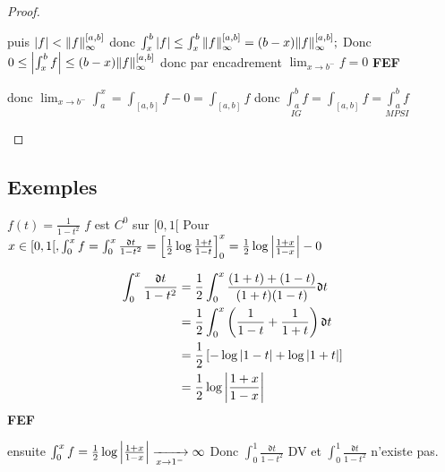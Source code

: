\documentclass[11pt,hidelinks]{book}
\theoremstyle{mytheoremstyle}
\theoremstyle{mytheoremstyle}
\theoremstyle{mytheoremstyle}
\theoremstyle{mytheoremstyle}
\theoremstyle{mytheoremstyle}
\theoremstyle{mytheoremstyle}
\theoremstyle{mytheoremstyle}
\theoremstyle{mytheoremstyle}
\theoremstyle{myproblemstyle}
\def\mfk#1{\mathfrak{#1}}
\def\fef{\textbf{FEF}}
\begin{document}
\begin{adjustwidth}{-2em}{-1em}
\begin{theorem}
\begin{proof}
\begin{itemize}[label=$\circ$]
\begin{ef}
                    puis $\abs{f} < \norm{f}_{\infty}^{[a,b]}$ donc $\int_{x}^{b} \abs{f} \leq \int_{x}^{b} \norm{f}_{\infty}^{[a,b]} = (b-x)\norm{f}^{[a,b]}_{\infty};$
                     Donc $0 \leq \abs{\int_{x}^{b} f} \leq (b-x)\norm{f}_{\infty}^{[a,b]}$ 
                    donc par encadrement $\lim_{x \to b^-} f = 0$ \fef
                \end{ef}
                donc $\lim_{x \to b^-} \int_{a}^{x} = \int_{[a,b]} f - 0 = \int_{[a,b]} f$
                donc $\underset{IG}{\int_{a}^{b} f} = \int_{[a,b]} f = \underset{MPSI}{\int_{a}^{b} f}$
            \end{itemize}
            \end{proof}
        \end{theorem}
        \subsection{Exemples}
        \begin{ex}
            $f(t) = \frac{1}{1-t^2}$ $f$ est $C^0$ sur $[0,1[$ 
            \newline 
            Pour $x \in [0,1[, \int_{0}^{x} f = \int_{0}^{x} \frac{\mfk{d}t}{1-t^2} = 
            \left[ \frac{1}{2} \log{\frac{1+t}{1-t}} \right]^x_0 = \frac{1}{2} \log{\abs{\frac{1+x}{1-x}}} - 0$
            \begin{ef}
                \begin{align*}
                    \int_{0}^{x} \frac{\mfk{d}t}{1-t^2} &= \frac{1}{2} \int_{0}^{x} \frac{(1+t) + (1-t)}{(1+t)(1-t)} \mfk{d}t \\ 
                                                        &= \frac{1}{2} \int_{0}^{x} \left( \frac{1}{1-t} + \frac{1}{1+t} \right) \mfk{d}t \\ 
                                                        &= \frac{1}{2} \left[- \log{\abs{1-t}} + \log{\abs{1+t}} \right] \\ 
                                                        &= \frac{1}{2} \log{\abs{\frac{1+x}{1-x}}} \\
                \end{align*}
                \fef 
            \end{ef}
            ensuite $\int_{0}^{x} f = \frac{1}{2} \log{\abs{\frac{1+x}{1-x}}} \xrightarrow[x\to 1^-]{} \infty$ 
            Donc $\int_{0}^{1} \frac{\mfk{d}t}{1-t^2}$ DV et $\int_{0}^{1} \frac{\mfk{d}t}{1-t^2}$ n'existe pas. 
        \end{ex}
        \begin{ex}

\end{ex}
\end{adjustwidth}
\end{document}
